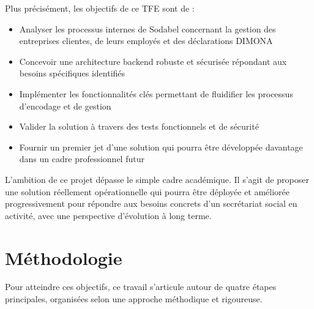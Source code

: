 \noindent Plus précisément, les objectifs de ce TFE sont de :
\begin{itemize}[leftmargin=*,label=\textcolor{darkgray}{$\bullet$},itemsep=0.3em]
  \item Analyser les processus internes de Sodabel concernant la gestion des entreprises clientes, de leurs employés et des déclarations DIMONA
  \item Concevoir une architecture backend robuste et sécurisée répondant aux besoins spécifiques identifiés
  \item Implémenter les fonctionnalités clés permettant de fluidifier les processus d'encodage et de gestion
  \item Valider la solution à travers des tests fonctionnels et de sécurité
  \item Fournir un premier jet d'une solution qui pourra être développée davantage dans un cadre professionnel futur
\end{itemize}

\noindent L'ambition de ce projet dépasse le simple cadre académique. Il s'agit de proposer une solution réellement opérationnelle qui pourra être déployée et améliorée progressivement pour répondre aux besoins concrets d'un secrétariat social en activité, avec une perspective d'évolution à long terme.


\section*{Méthodologie}

\noindent Pour atteindre ces objectifs, ce travail s'articule autour de quatre étapes principales, organisées selon une approche méthodique et rigoureuse.


